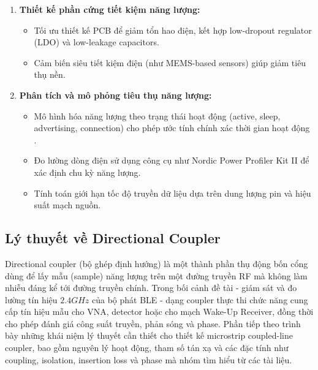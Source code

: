 \begin{enumerate}[label=\arabic*)]
	\item \textbf{Thiết kế phần cứng tiết kiệm năng lượng:} 
		\begin{itemize}[label=-]
			\item Tối ưu thiết kế PCB để giảm tổn hao điện, kết hợp low-dropout regulator (LDO) và low-leakage capacitors.
			\item Cảm biến siêu tiết kiệm điện (như MEMS-based sensors) giúp giảm tiêu thụ nền.
		\end{itemize}
	\item \textbf{Phân tích và mô phỏng tiêu thụ năng lượng:} 
		\begin{itemize}[label=-]
			\item Mô hình hóa năng lượng theo trạng thái hoạt động (active, sleep, advertising, connection) cho phép ước tính chính xác thời gian hoạt động \cite{Hauer2021BLEBatteryModeling}.
			\item Đo lường dòng điện sử dụng công cụ như Nordic Power Profiler Kit II để xác định chu kỳ năng lượng.
			\item Tính toán giới hạn tốc độ truyền dữ liệu dựa trên dung lượng pin và hiệu suất mạch nguồn.
		\end{itemize}
\end{enumerate}

\subsection{Lý thuyết về Directional Coupler}

Directional coupler (bộ ghép định hướng) là một thành phần thụ động bốn cổng dùng để lấy mẫu (sample) năng lượng trên một đường truyền RF mà không làm nhiễu đáng kể tới đường truyền chính. Trong bối cảnh đề tài - giám sát và đo lường tín hiệu $2.4GHz$ của bộ phát BLE - dạng coupler thực thi chức năng cung cấp tín hiệu mẫu cho VNA, detector hoặc cho mạch Wake-Up Receiver, đồng thời cho phép đánh giá công suất truyền, phản sóng và phase. Phần tiếp theo trình bày những khái niệm lý thuyết cần thiết cho thiết kế microstrip coupled-line coupler, bao gồm nguyên lý hoạt động, tham số tán xạ và các đặc tính như coupling, isolation, insertion loss và phase mà nhóm tìm hiểu từ các tài liệu.

